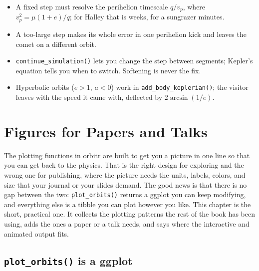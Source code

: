 \documentclass[
  10.5pt,
  letterpaper,
]{scrbook}
\providecommand{\tightlist}{%
  \setlength{\itemsep}{0pt}\setlength{\parskip}{0pt}}
\theoremstyle{plain}
\theoremstyle{remark}
\begin{document}
\begin{tcolorbox}[enhanced jigsaw, arc=.35mm, bottomrule=.15mm, bottomtitle=1mm, breakable, colback=white, colbacktitle=quarto-callout-tip-color!10!white, colframe=quarto-callout-tip-color-frame, coltitle=black, left=2mm, leftrule=.75mm, opacityback=0, opacitybacktitle=0.6, rightrule=.15mm, title={Key results}, titlerule=0mm, toprule=.15mm, toptitle=1mm]

\begin{itemize}
\tightlist
\item
  A fixed step must resolve the perihelion timescale \(q/v_p\), where
  \(v_p^2 = \mu(1+e)/q\); for Halley that is weeks, for a sungrazer
  minutes.
\item
  A too-large step makes its whole error in one perihelion kick and
  leaves the comet on a different orbit.
\item
  \texttt{continue\_simulation()} lets you change the step between
  segments; Kepler's equation tells you when to switch. Softening is
  never the fix.
\item
  Hyperbolic orbits (\(e > 1\), \(a < 0\)) work in
  \texttt{add\_body\_keplerian()}; the visitor leaves with the speed it
  came with, deflected by \(2\arcsin(1/e)\).
\end{itemize}

\end{tcolorbox}

\chapter{Figures for Papers and Talks}\label{sec-figures}

The plotting functions in orbitr are built to get you a picture in one
line so that you can get back to the physics. That is the right design
for exploring and the wrong one for publishing, where the picture needs
the units, labels, colors, and size that your journal or your slides
demand. The good news is that there is no gap between the two:
\texttt{plot\_orbits()} returns a ggplot you can keep modifying, and
everything else is a tibble you can plot however you like. This chapter
is the short, practical one. It collects the plotting patterns the rest
of the book has been using, adds the ones a paper or a talk needs, and
says where the interactive and animated output fits.

\section{\texorpdfstring{\texttt{plot\_orbits()} is a
ggplot}{plot\_orbits() is a ggplot}}\label{plot_orbits-is-a-ggplot}
\end{document}
